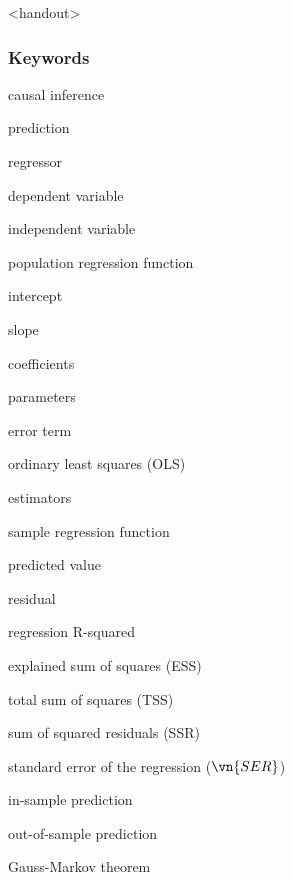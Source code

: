 

\begin{frame}<handout>
\frametitle{Keywords}
\begin{iteminline}
\item causal inference
\item prediction
\item regressor
\item dependent variable
\item independent variable
\item population regression function
\item intercept
\item slope
\item coefficients
\item parameters
\item error term
\item ordinary least squares (OLS)
\item estimators
\item sample regression function
\item predicted value
\item residual
\item regression R-squared
\item explained sum of squares (ESS)
\item total sum of squares (TSS)
\item sum of squared residuals (SSR)
\item standard error of the regression ($\vn{SER}$)
\item in-sample prediction
\item out-of-sample prediction
\item Gauss-Markov theorem
\end{iteminline}
\end{frame}


